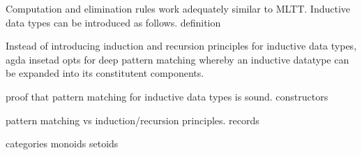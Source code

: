 
Computation and elimination rules work adequately similar to MLTT. Inductive
data types can be introduced as follows.
definition

Instead of introducing induction and recursion principles for inductive data
types, agda insetad opts for deep pattern matching whereby an inductive datatype
can be expanded into its constitutent components.

proof that pattern matching for inductive data types is sound.
constructors

pattern matching vs induction/recursion principles.
records

categories
monoids
setoids
